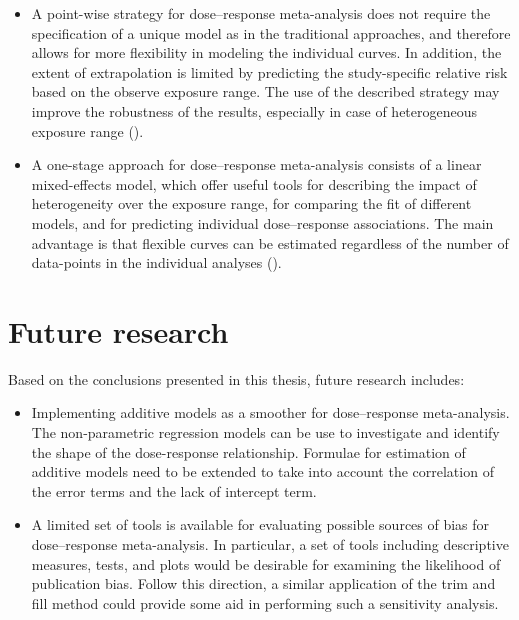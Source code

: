\documentclass[11pt,a4paper,twoside,openany]{book}\usepackage{knitr}
\begin{document}
{\begin{itemize}
\item A point-wise strategy for dose--response meta-analysis does not require the specification of a unique model as in the traditional approaches, and therefore allows for more flexibility in modeling the individual curves. In addition, the extent of extrapolation is limited by predicting the study-specific relative risk based on the observe exposure range. The use of the described strategy may improve the robustness of the results, especially in case of heterogeneous exposure range ().

\item A one-stage approach for dose--response meta-analysis consists of a linear mixed-effects model, which offer useful tools for describing the impact of heterogeneity over the exposure range, for comparing the fit of different models, and for predicting individual dose--response associations. The main advantage is that flexible curves can be estimated regardless of the number of data-points in the individual analyses ().

\end{itemize}


%

\chapter{Future research}

Based on the conclusions presented in this thesis, future research includes: 

\begin{itemize}
\item Implementing additive models as a smoother for dose--response meta-analysis. The non-parametric regression models can be use to investigate and identify the shape of the dose-response relationship. Formulae for estimation of additive models need to be extended to take into account the correlation of the error terms and the lack of intercept term.

\item A limited set of tools is available for evaluating possible sources of bias for dose--response meta-analysis. In particular, a set of tools including descriptive measures, tests, and plots would be desirable for examining the likelihood of publication bias. Follow this direction, a similar application of the trim and fill method could provide some aid in performing such a sensitivity analysis.


\end{itemize}}
\end{document}
